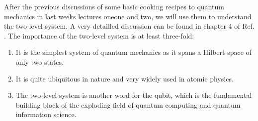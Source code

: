 After the previous discussions of some basic cooking recipes to quantum mechanics in last weeks lectures \href{https://www.authorea.com/326007/wyOpqBcLPiiNhswBbwDHbA}{one}one and two, we will use them to understand the two-level system. A very detailled discussion can be found in chapter 4 of Ref. \cite{1}. The importance of the two-level system is at least three-fold:
\begin{enumerate}
\item It is the simplest system of quantum mechanics as it spans a Hilbert space of only two states.
\item It is quite ubiquitous in nature and very widely used in atomic physics.
\item The two-level system is another word for the qubit, which is the fundamental building block of the exploding field of quantum computing and quantum information science.
\end{enumerate}

